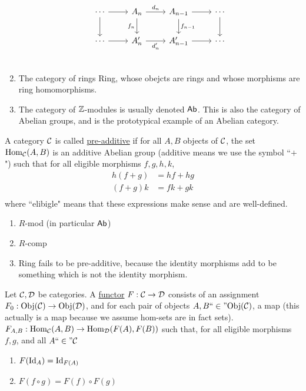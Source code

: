 \documentclass[x11names,reqno,14pt]{extarticle}
\newcommand{\fin}{``\in"}
\begin{document}
\begin{enumerate}
\[
\begin{tikzcd}
\cdots \ar[r] \ar[d] & A_{n} \ar[d, "f_n"'] \ar[r, "d_{n}"] & A_{n - 1} \ar[r] \ar[d, "f_{n - 1}"] & \ar[d]\cdots  \\
\cdots \ar[r] & A'_n \ar[r, "d'_n"'] & A'_{n - 1} \ar[r] & \cdots \\
\end{tikzcd}
\]

\item The category of rings Ring, whose obejcts are rings and whose morphisms are ring homomorphisms. 

\item The category of $\mathbb{Z}$-modules is usually denoted ${{\text{\sffamily {Ab}}}}$. This is also the category of Abelian groups, and is the prototypical example of an Abelian category.

\end{enumerate}

 A category $\mathcal{C}$ is called \underline{pre-additive} if for all $A, B$ objects of $\mathcal{C}$, the set ${\mathrm{Hom}}_{\mathcal{C}}(A, B)$ is an additive Abelian group (additive means we use the symbol ``$+$") such that for all eligible morphisms $f, g, h, k$, 
\begin{align*}
h(f + g) & = hf + hg \\
(f + g)k & = fk + gk \\
\end{align*}
where ``elibigle" means that these expressions make sense and are well-defined. 

\exm

\begin{enumerate}

\item $R$-mod (in particular ${{\text{\sffamily {Ab}}}}$)

\item $R$-comp

\item Ring fails to be pre-additive, because the identity morphisms add to be something which is not the identity morphism. 

\end{enumerate}


Let $\mathcal{C}, \mathcal{D}$ be categories. A \underline{functor} $F:\mathcal{C}\to\mathcal{D}$ consists of an assignment $F_0:{\mathrm{Obj}}(\mathcal{C})\to{\mathrm{Obj}}(\mathcal{D})$, and for each pair of objects $A, B ``\in" {\mathrm{Obj}}(\mathcal{C})$, a map (this actually is a map because we assume hom-sets are in fact sets). $F_{A, B}:{\mathrm{Hom}}_{\mathcal{C}}(A, B) \to {\mathrm{Hom}}_{\mathcal{D}}(F(A), F(B))$ such that, for all eligible morphisms $f, g$, and all $A \fin \mc{C}$
\begin{enumerate}[label=(\alph*)]

\item $F(\operatorname{\mathrm{Id}}_A) = \operatorname{\mathrm{Id}}_{F(A)}$
\item $F(f\circ g) = F(f)\circ F(g)$

\end{enumerate}
\end{document}
